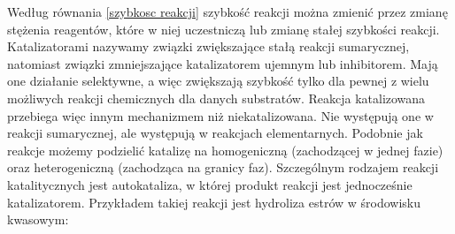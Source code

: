 \documentclass[10pt, a4paper, twoside, onecolumn]{article}
\numberwithin{equation}{section}
\begin{document}
	
	Według równania \eqref{szybkosc reakcji} szybkość reakcji można zmienić przez zmianę stężenia reagentów, które w niej uczestniczą lub zmianę stałej szybkości reakcji. Katalizatorami nazywamy związki zwiększające stałą reakcji sumarycznej, natomiast związki zmniejszające katalizatorem ujemnym lub inhibitorem. Mają one działanie selektywne, a więc zwiększają szybkość tylko dla pewnej z wielu możliwych reakcji chemicznych dla danych substratów. Reakcja katalizowana przebiega więc innym mechanizmem niż niekatalizowana. Nie występują one w reakcji sumarycznej, ale występują w reakcjach elementarnych. Podobnie jak reakcje możemy podzielić katalizę na homogeniczną (zachodzącej w jednej fazie) oraz heterogeniczną (zachodząca na granicy faz). Szczególnym rodzajem reakcji katalitycznych jest autokataliza, w której produkt reakcji jest jednocześnie katalizatorem. Przykładem takiej reakcji jest hydroliza estrów w środowisku kwasowym: \cite{pigon1}
	\begin{center}
	\end{center}
	
\end{document}
